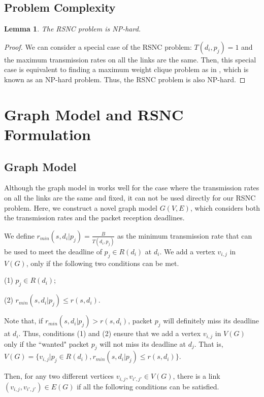\documentclass[journal]{IEEEtran}
\newtheorem{lemma}{\textbf{Lemma}}
\begin{document}
\vspace{-0.1in}
\subsection{Problem Complexity}
\begin{lemma}
The RSNC problem is NP-hard.
\end{lemma}\vspace{-0.1in}
\begin{proof}
We can consider a special case of the RSNC problem: $T(d_i,p_j)=1$ and the maximum transmission rates on all the links are the same. Then, this special case is equivalent to finding a maximum weight clique problem as in \cite{ZX2010Broadcast6}, which is known as an NP-hard problem. Thus, the RSNC problem is also NP-hard.
\end{proof}

\vspace{-0.1in}
\section{Graph Model and RSNC Formulation}\label{Sec.solution}
\subsection{Graph Model}\label{graph.model}
Although the graph model in \cite{ZX2010Broadcast6} works well for the case where the transmission rates on all the links are the same and fixed, it can not be used directly for our RSNC problem. Here, we construct a novel graph model $G(V,E)$, which considers both the transmission rates and the packet reception deadlines.

We define $r_{min}(s,d_i|p_j)=\frac{B}{T(d_i,p_j)}$ as the minimum transmission rate that can be used to meet the deadline of $p_j\in R(d_i)$ at $d_i$.
We add a vertex $v_{i,j}$ in $V(G)$, only if the following two conditions can be met.

(1) $p_j\in R(d_i)$;

(2) $r_{min}(s,d_i|p_j)\leq r(s,d_i)$.

Note that, if $r_{min}(s,d_i|p_j)> r(s,d_i)$, packet $p_j$ will definitely miss its deadline at $d_i$.
Thus, conditions (1) and (2) ensure that we add a vertex $v_{i,j}$ in $V(G)$ only if the ``wanted" packet $p_j$ will not miss its deadline at $d_j$.
That is, $V(G)=\{v_{i,j}|p_j\in R(d_i), r_{min}(s,d_i|p_j)\leq r(s,d_i)\}$.

Then, for any two different vertices $v_{i,j},v_{i',j'}\in V(G)$, there is a link $(v_{i,j},v_{i',j'})\in E(G)$ if all the following conditions can be satisfied.
\end{document}
